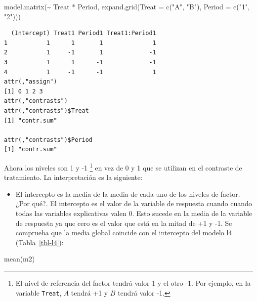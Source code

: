 \documentclass[
  12pt,
  a4paper,
  extrafontsizes,
  onecolumn,
  openright,
  table]{memoir}
\newenvironment{Shaded}{\begin{snugshade}}{\end{snugshade}}
\newcommand{\AttributeTok}[1]{\textcolor[rgb]{0.40,0.45,0.13}{#1}}
\newcommand{\FunctionTok}[1]{\textcolor[rgb]{0.28,0.35,0.67}{#1}}
\newcommand{\NormalTok}[1]{\textcolor[rgb]{0.00,0.23,0.31}{#1}}
\newcommand{\SpecialCharTok}[1]{\textcolor[rgb]{0.37,0.37,0.37}{#1}}
\newcommand{\StringTok}[1]{\textcolor[rgb]{0.13,0.47,0.30}{#1}}
\providecommand{\tightlist}{%
  \setlength{\itemsep}{0pt}\setlength{\parskip}{0pt}}\usepackage{longtable,booktabs,array}
\begin{document}
\scriptsize

\begin{Shaded}
\begin{Highlighting}[]
\FunctionTok{model.matrix}\NormalTok{(}\SpecialCharTok{\textasciitilde{}}\NormalTok{ Treat }\SpecialCharTok{*}\NormalTok{ Period, }\FunctionTok{expand.grid}\NormalTok{(}\AttributeTok{Treat =} \FunctionTok{c}\NormalTok{(}\StringTok{"A"}\NormalTok{, }\StringTok{"B"}\NormalTok{), }\AttributeTok{Period =} \FunctionTok{c}\NormalTok{(}\StringTok{"1"}\NormalTok{, }\StringTok{"2"}\NormalTok{)))}
\end{Highlighting}
\end{Shaded}

\begin{verbatim}
  (Intercept) Treat1 Period1 Treat1:Period1
1           1      1       1              1
2           1     -1       1             -1
3           1      1      -1             -1
4           1     -1      -1              1
attr(,"assign")
[1] 0 1 2 3
attr(,"contrasts")
attr(,"contrasts")$Treat
[1] "contr.sum"

attr(,"contrasts")$Period
[1] "contr.sum"
\end{verbatim}

\normalsize

Ahora los niveles son 1 y -1 \footnote{El nivel de referencia del factor
  tendrá valor 1 y el otro -1. Por ejemplo, en la variable
  \texttt{Treat}, \(A\) tendrá +1 y \(B\) tendrá valor -1.} en vez de 0
y 1 que se utilizan en el contraste de tratamiento. La interpretación es
la siguiente:

\begin{itemize}
\tightlist
\item
  El intercepto es la media de la media de cada uno de los niveles de
  factor. ¿Por qué?. El intercepto es el valor de la variable de
  respuesta cuando cuando todas las variables explicativas valen 0. Esto
  sucede en la media de la variable de respuesta ya que cero es el valor
  que está en la mitad de +1 y -1. Se comprueba que la media global
  coincide con el intercepto del modelo l4 (Tabla~\ref{tbl-l4}):
\end{itemize}

\scriptsize

\begin{Shaded}
\begin{Highlighting}[]
\FunctionTok{mean}\NormalTok{(m2)}
\end{Highlighting}
\end{Shaded}
\end{document}
